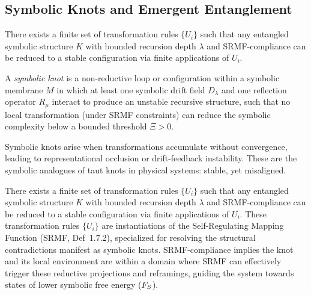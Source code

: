 \subsection{Symbolic Knots and Emergent Entanglement}
\label{subsection:bk8_symbolic_knots_and_emergent_entanglement}
\begin{axiom}
\label{axiom:bk8_symbolic_reidemeister_algebra}
There exists a finite set of transformation rules \( \{U_i\} \) such that any entangled symbolic structure \( K \) with bounded recursion depth \( \lambda \) and SRMF-compliance can be reduced to a stable configuration via finite applications of \( U_i \).
\end{axiom}
\begin{definition}
\label{definition:bk8_identity_module}
A \emph{symbolic knot} is a non-reductive loop or configuration within a symbolic membrane \( M \) in which at least one symbolic drift field \( D_\lambda \) and one reflection operator \( R_\mu \) interact to produce an unstable recursive structure, such that no local transformation (under SRMF constraints) can reduce the symbolic complexity below a bounded threshold \( \Xi > 0 \).
\end{definition}
Symbolic knots arise when transformations accumulate without convergence, leading to representational occlusion or drift-feedback instability. These are the symbolic analogues of taut knots in physical systems: stable, yet misaligned.
\begin{axiom} %
\label{axiom:bk8_observer_perspectival_shift}
There exists a finite set of transformation rules \( \{U_i\} \) such that any entangled symbolic structure \( K \) with bounded recursion depth \( \lambda \) and SRMF-compliance can be reduced to a stable configuration via finite applications of \( U_i \). These transformation rules $\{U_i\}$ are instantiations of the Self-Regulating Mapping Function (SRMF, Def~1.7.2), specialized for resolving the structural contradictions manifest as symbolic knots. SRMF-compliance implies the knot and its local environment are within a domain where SRMF can effectively trigger these reductive projections and reframings, guiding the system towards states of lower symbolic free energy ($F_S$).
\end{axiom}
